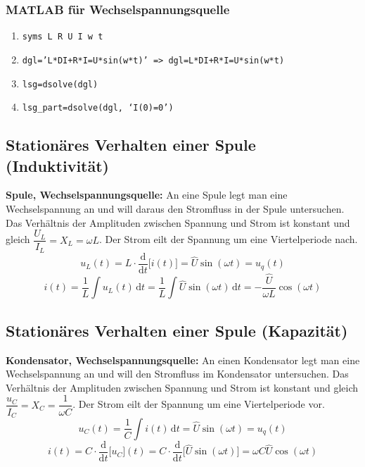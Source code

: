 \subsubsection{MATLAB für Wechselspannungsquelle}
\begin{enumerate}[$\texttt{>}\texttt{>}$]
\item {\color{red}\texttt{syms L R U I w t}}
\item {\color{red}\texttt{dgl='L*DI+R*I=U*sin(w*t)' => dgl=L*DI+R*I=U*sin(w*t)}}
\item {\color{red}\texttt{lsg=dsolve(dgl)}}
\item {\color{red}\texttt{lsg\_part=dsolve(dgl, `I(0)=0')}}
\end{enumerate}
\subsection{Stationäres Verhalten einer Spule (Induktivität)}
\textbf{Spule, Wechselspannungsquelle:} An eine Spule legt man eine Wechselspannung an und will daraus den Stromfluss in der Spule untersuchen. Das Verhältnis der Amplituden zwischen Spannung und Strom ist konstant und gleich $\dfrac{U_L}{I_L}=X_L=\omega L$. Der Strom eilt der Spannung um eine Viertelperiode nach.
\begin{equation}
\boxed{u_L\left(t\right)=L\cdot \dfrac{\text{d}}{\text{d}t}\Big[i\left(t\right)\Big]=\hat{U}\sin\left(\omega t\right)=u_q\left(t\right)}
\end{equation}
\begin{equation}
\boxed{i\left(t\right)=\dfrac{1}{L}\displaystyle \int u_L\left(t\right)\,\text{d}t=\dfrac{1}{L}\displaystyle \int \hat{U}\sin\left(\omega t\right)\,\text{d}t=-\dfrac{\hat{U}}{\omega L}\cos\left(\omega t\right)}
\end{equation}
\subsection{Stationäres Verhalten einer Spule (Kapazität)}
\textbf{Kondensator, Wechselspannungsquelle:} An einen Kondensator legt man eine Wechselspannung an und will den Stromfluss im Kondensator untersuchen. Das Verhältnis der Amplituden zwischen Spannung und Strom ist konstant und gleich $\dfrac{u_C}{I_C}=X_C=\dfrac{1}{\omega C}$. Der Strom eilt der Spannung um eine Viertelperiode vor. 
\begin{equation}
\boxed{u_C\left(t\right)=\dfrac{1}{C} \displaystyle \int i\left(t\right)\,\text{d}t=\hat{U}\sin\left(\omega t\right)=u_q\left(t\right)}
\end{equation}
\begin{equation}
\boxed{i\left(t\right)=C\cdot \dfrac{\text{d}}{\text{d}t}\Big[u_C\Big]\left(t\right)=C\cdot \dfrac{\text{d}}{\text{d}t}\Big[\hat{U}\sin\left(\omega t\right)\Big]=\omega C \hat{U}\cos\left(\omega t\right)}
\end{equation}
